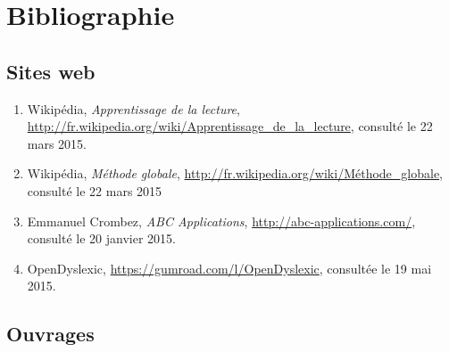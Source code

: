 \section{Bibliographie}

\subsection*{Sites web}
\begin{enumerate}
\item Wikipédia, \textit{Apprentissage de la lecture}, \url{http://fr.wikipedia.org/wiki/Apprentissage_de_la_lecture}, consulté le 22 mars 2015.
\item Wikipédia, \textit{Méthode globale}, \url{http://fr.wikipedia.org/wiki/Méthode_globale}, consulté le 22 mars 2015
\item Emmanuel Crombez, \textit{ABC Applications}, \url{http://abc-applications.com/}, consulté le 20 janvier 2015.
\item OpenDyslexic, \url{https://gumroad.com/l/OpenDyslexic}, consultée le 19 mai 2015.
\end{enumerate}

\subsection*{Ouvrages}